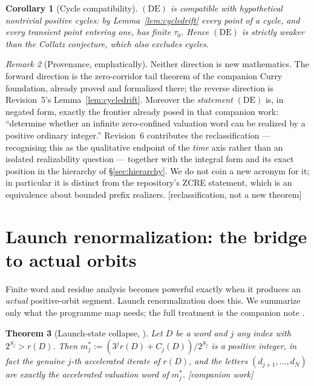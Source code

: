 \documentclass[11pt]{article}
\theoremstyle{plain}
\newtheorem{theorem}{Theorem}[section]
\newtheorem{corollary}[theorem]{Corollary}
\theoremstyle{definition}
\theoremstyle{remark}
\newtheorem{remark}[theorem]{Remark}
\newcommand{\status}[1]{\textsf{\footnotesize[#1]}}
\begin{document}
\begin{corollary}[Cycle compatibility]\label{cor:cycles}
$(\mathrm{DE})$ is compatible with hypothetical nontrivial positive cycles: by
Lemma~\ref{lem:cycledrift} every point of a cycle, and every transient point entering one, has
finite $\tau_0$. Hence $(\mathrm{DE})$ is \emph{strictly weaker} than the Collatz conjecture, which
also excludes cycles.
\end{corollary}

\begin{remark}[Provenance, emphatically]\label{rem:DEprov}
Neither direction is new mathematics. The forward direction is the zero-corridor tail theorem of
the companion Curry foundation, already proved and formalized there; the reverse direction is
Revision~5's Lemma~\ref{lem:cycledrift}. Moreover the \emph{statement} $(\mathrm{DE})$ is, in
negated form, exactly the frontier already posed in that companion work: ``determine whether an
infinite zero-confined valuation word can be realized by a positive ordinary integer.'' Revision~6
contributes the reclassification --- recognising this as the qualitative endpoint of the
\emph{time} axis rather than an isolated realizability question --- together with the integral form
and its exact position in the hierarchy of \S\ref{sec:hierarchy}. We do not coin a new acronym for
it; in particular it is distinct from the repository's ZCRE statement, which is an equivalence
about bounded prefix realizers. \status{reclassification, not a new theorem}
\end{remark}

\section{Launch renormalization: the bridge to actual orbits}\label{sec:launch}

Finite word and residue analysis becomes powerful exactly when it produces an \emph{actual}
positive-orbit segment. Launch renormalization does this. We summarize only what the programme map
needs; the full treatment is the companion note \cite{DJlaunch}.

\begin{theorem}[Launch-state collapse, {\cite{DJlaunch}}]\label{thm:launch}
Let $D$ be a word and $j$ any index with $2^{S_j}>r(D)$. Then
$m^*_j:=(3^j r(D)+C_j(D))/2^{S_j}$ is a positive integer, in fact the genuine $j$-th accelerated
iterate of $r(D)$, and the letters $(d_{j+1},\dots,d_N)$ are exactly the accelerated valuation word
of $m^*_j$. \status{companion work}
\end{theorem}
\end{document}
